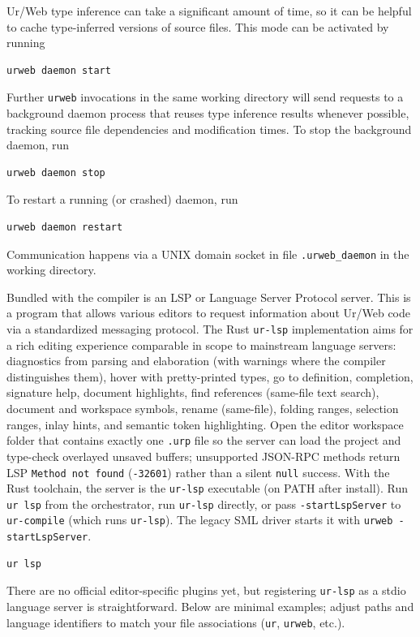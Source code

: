 \documentclass{article}
\newcommand{\cd}[1]{\texttt{#1}}
\begin{document}
Ur/Web type inference can take a significant amount of time, so it can be helpful to cache type-inferred versions of source files.  This mode can be activated by running
\begin{verbatim}
urweb daemon start
\end{verbatim}
Further \cd{urweb} invocations in the same working directory will send requests to a background daemon process that reuses type inference results whenever possible, tracking source file dependencies and modification times.  To stop the background daemon, run
\begin{verbatim}
urweb daemon stop
\end{verbatim}
To restart a running (or crashed) daemon, run
\begin{verbatim}
urweb daemon restart
\end{verbatim}
Communication happens via a UNIX domain socket in file \cd{.urweb\_daemon} in the working directory.

Bundled with the compiler is an LSP or Language Server Protocol server. This is a program that allows various editors to request information about Ur/Web code via a standardized messaging protocol. The Rust \cd{ur-lsp} implementation aims for a rich editing experience comparable in scope to mainstream language servers: diagnostics from parsing and elaboration (with warnings where the compiler distinguishes them), hover with pretty-printed types, go to definition, completion, signature help, document highlights, find references (same-file text search), document and workspace symbols, rename (same-file), folding ranges, selection ranges, inlay hints, and semantic token highlighting. Open the editor workspace folder that contains exactly one \cd{.urp} file so the server can load the project and type-check overlayed unsaved buffers; unsupported JSON-RPC methods return LSP \texttt{Method not found} (\texttt{-32601}) rather than a silent \texttt{null} success.
With the Rust toolchain, the server is the \cd{ur-lsp} executable (on PATH after install). Run \cd{ur lsp} from the orchestrator, run \cd{ur-lsp} directly, or pass \cd{-startLspServer} to \cd{ur-compile} (which runs \cd{ur-lsp}). The legacy SML driver starts it with \cd{urweb -startLspServer}.
\begin{verbatim}
ur lsp
\end{verbatim}
There are no official editor-specific plugins yet, but registering \cd{ur-lsp} as a stdio language server is straightforward. Below are minimal examples; adjust paths and language identifiers to match your file associations (\cd{ur}, \cd{urweb}, etc.).
\end{document}
